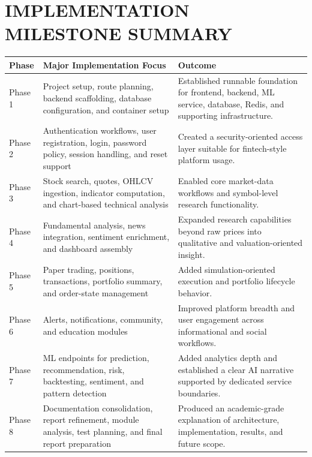 \documentclass[12pt,a4paper]{report}
\begin{document}
\chapter{IMPLEMENTATION MILESTONE SUMMARY}
\begin{longtable}{p{} p{} p{}}
\textbf{Phase} & \textbf{Major Implementation Focus} & \textbf{Outcome} \\
\hline
Phase 1 & Project setup, route planning, backend scaffolding, database configuration, and container setup & Established runnable foundation for frontend, backend, ML service, database, Redis, and supporting infrastructure. \\
Phase 2 & Authentication workflows, user registration, login, password policy, session handling, and reset support & Created a security-oriented access layer suitable for fintech-style platform usage. \\
Phase 3 & Stock search, quotes, OHLCV ingestion, indicator computation, and chart-based technical analysis & Enabled core market-data workflows and symbol-level research functionality. \\
Phase 4 & Fundamental analysis, news integration, sentiment enrichment, and dashboard assembly & Expanded research capabilities beyond raw prices into qualitative and valuation-oriented insight. \\
Phase 5 & Paper trading, positions, transactions, portfolio summary, and order-state management & Added simulation-oriented execution and portfolio lifecycle behavior. \\
Phase 6 & Alerts, notifications, community, and education modules & Improved platform breadth and user engagement across informational and social workflows. \\
Phase 7 & ML endpoints for prediction, recommendation, risk, backtesting, sentiment, and pattern detection & Added analytics depth and established a clear AI narrative supported by dedicated service boundaries. \\
Phase 8 & Documentation consolidation, report refinement, module analysis, test planning, and final report preparation & Produced an academic-grade explanation of architecture, implementation, results, and future scope. \\
\end{longtable}
\end{document}
